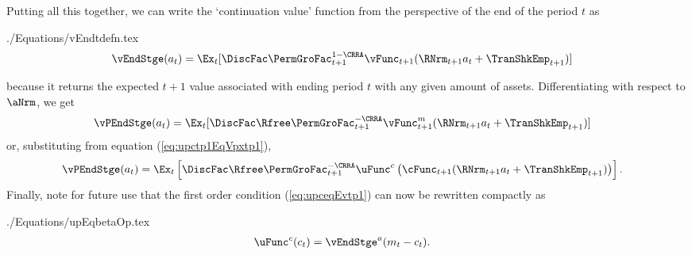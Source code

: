 \documentclass[titlepage, headings=optiontotocandhead]{\econtex}
\providecommand{\stge}{t}\renewcommand{\stge}{t}
\providecommand{\interval}{period}\renewcommand{\interval}{period}
\providecommand{\interval}{period}\renewcommand{\interval}{period}
\begin{document}
Putting all this together, we can write the `continuation value' function from the perspective of the end of the {\interval} $\stge$ as 
\begin{verbatimwrite}{./Equations/vEndtdefn.tex}
  \begin{equation}\begin{gathered}\begin{aligned}
        \vEndStge({a}_{\stge})  & = \Ex_{\stge}[\DiscFac \PermGroFac_{\stge+1}^{1-\CRRA}\null{\vFunc}_{\stge+1}(\RNrm_{\stge+1} {a}_{\stge}+{\TranShkEmp}_{\stge+1})]  \label{eq:vEndtdefn}
      \end{aligned}\end{gathered}\end{equation}
\end{verbatimwrite}
\unskip
because it returns the expected $t+1$ value associated with ending {\interval} $\stge$ with any given amount of assets.  Differentiating with respect to $\aNrm$, we get 
\begin{equation}\begin{gathered}\begin{aligned}
      {\vPEndStge}({a}_{\stge})  & = \Ex_{\stge}[\DiscFac \Rfree \PermGroFac_{\stge+1}^{-\CRRA} \null{\vFunc}_{\stge+1}^{{m}}(\RNrm_{\stge+1}{a}_{\stge}+{\TranShkEmp}_{\stge+1})]  \label{eq:vEndPrimetdefn}
    \end{aligned}\end{gathered}\end{equation}
or, substituting from equation (\ref{eq:upctp1EqVpxtp1}),
\begin{equation}\begin{gathered}\begin{aligned}
      \vPEndStge({a}_{\stge})  & = \Ex_{\stge}\left[\DiscFac \Rfree \PermGroFac_{\stge+1}^{-\CRRA} \uFunc^{{c}}\left(\cFunc_{\stge+1}(\RNrm_{\stge+1} {a}_{\stge}+{\TranShkEmp}_{\stge+1})\right)\right].  \label{eq:vEndPrimetOfc}
    \end{aligned}\end{gathered}\end{equation}
Finally, note for future use that the first order condition
(\ref{eq:upceqEvtp1}) can now be rewritten compactly as
\begin{verbatimwrite}{./Equations/upEqbetaOp.tex}
  \begin{equation}\begin{gathered}\begin{aligned}
        \uFunc^{{c}}({c}_{\stge})   & = \vEndStge^{{a}}({m}_{\stge}-{c}_{\stge}).
        \label{eq:upEqbetaOp}
      \end{aligned}\end{gathered}\end{equation}
\end{verbatimwrite}
\end{document}
